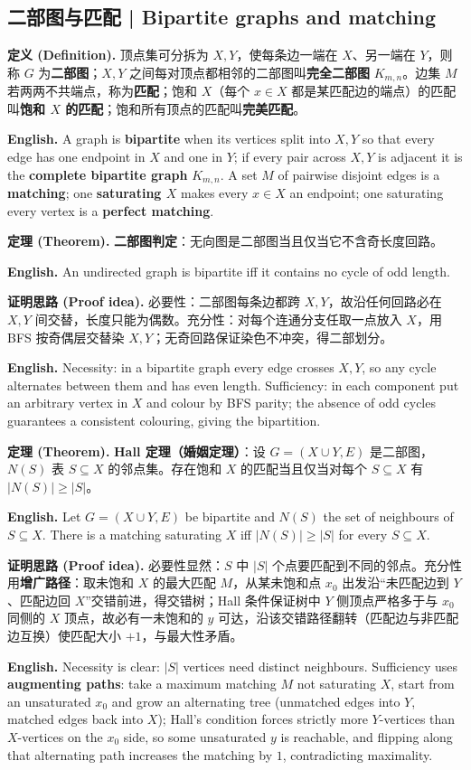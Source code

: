 \documentclass[UTF8,11pt,a4paper]{ctexart}
\newcommand{\EN}[1]{\par\noindent \textbf{English.} #1\par}
\newcommand{\DEF}[2]{\par\noindent\textbf{定义 (Definition).} #1\par\EN{#2}}
\newcommand{\THM}[2]{\par\noindent\textbf{定理 (Theorem).} #1\par\EN{#2}}
\newcommand{\PRF}[2]{\par\noindent\textbf{证明思路 (Proof idea).} #1\par\EN{#2}}
\begin{document}
\subsection{二部图与匹配 | Bipartite graphs and matching}
\DEF{顶点集可分拆为 $X,Y$，使每条边一端在 $X$、另一端在 $Y$，则称 $G$ 为\textbf{二部图}；$X,Y$ 之间每对顶点都相邻的二部图叫\textbf{完全二部图} $K_{m,n}$。边集 $M$ 若两两不共端点，称为\textbf{匹配}；饱和 $X$（每个 $x\in X$ 都是某匹配边的端点）的匹配叫\textbf{饱和 $X$ 的匹配}；饱和所有顶点的匹配叫\textbf{完美匹配}。}{A graph is \textbf{bipartite} when its vertices split into $X,Y$ so that every edge has one endpoint in $X$ and one in $Y$; if every pair across $X,Y$ is adjacent it is the \textbf{complete bipartite graph} $K_{m,n}$. A set $M$ of pairwise disjoint edges is a \textbf{matching}; one \textbf{saturating $X$} makes every $x\in X$ an endpoint; one saturating every vertex is a \textbf{perfect matching}.}
\THM{\textbf{二部图判定}：无向图是二部图当且仅当它不含奇长度回路。}{An undirected graph is bipartite iff it contains no cycle of odd length.}
\PRF{必要性：二部图每条边都跨 $X,Y$，故沿任何回路必在 $X,Y$ 间交替，长度只能为偶数。充分性：对每个连通分支任取一点放入 $X$，用 BFS 按奇偶层交替染 $X,Y$；无奇回路保证染色不冲突，得二部划分。}{Necessity: in a bipartite graph every edge crosses $X,Y$, so any cycle alternates between them and has even length. Sufficiency: in each component put an arbitrary vertex in $X$ and colour by BFS parity; the absence of odd cycles guarantees a consistent colouring, giving the bipartition.}
\THM{\textbf{Hall 定理（婚姻定理）}：设 $G=(X\cup Y,E)$ 是二部图，$N(S)$ 表 $S\subseteq X$ 的邻点集。存在饱和 $X$ 的匹配当且仅当对每个 $S\subseteq X$ 有 $|N(S)|\ge|S|$。}{Let $G=(X\cup Y,E)$ be bipartite and $N(S)$ the set of neighbours of $S\subseteq X$. There is a matching saturating $X$ iff $|N(S)|\ge|S|$ for every $S\subseteq X$.}
\PRF{必要性显然：$S$ 中 $|S|$ 个点要匹配到不同的邻点。充分性用\textbf{增广路径}：取未饱和 $X$ 的最大匹配 $M$，从某未饱和点 $x_0$ 出发沿“未匹配边到 $Y$、匹配边回 $X$”交错前进，得交错树；Hall 条件保证树中 $Y$ 侧顶点严格多于与 $x_0$ 同侧的 $X$ 顶点，故必有一未饱和的 $y$ 可达，沿该交错路径翻转（匹配边与非匹配边互换）使匹配大小 $+1$，与最大性矛盾。}{Necessity is clear: $|S|$ vertices need distinct neighbours. Sufficiency uses \textbf{augmenting paths}: take a maximum matching $M$ not saturating $X$, start from an unsaturated $x_0$ and grow an alternating tree (unmatched edges into $Y$, matched edges back into $X$); Hall's condition forces strictly more $Y$-vertices than $X$-vertices on the $x_0$ side, so some unsaturated $y$ is reachable, and flipping along that alternating path increases the matching by $1$, contradicting maximality.}
\end{document}
